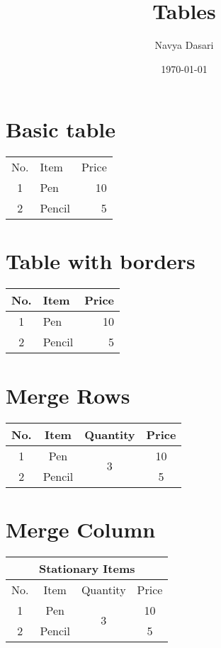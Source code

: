\documentclass[12pt]{article}
\title{Tables}
\author{Navya Dasari}
\date{\today}
\begin{document}
	\maketitle
	
	\section{Basic table}
	
		\begin{tabular}{clr}
		
		No.	&	Item	&	Price \\
		1	&	Pen		& 10 \\
		2	&	Pencil	& 5 \\
		
		\end{tabular}
		
	\section{Table with borders}
		\begin{tabular}{|c|l|r|}
			\hline
			No.	&	Item	&	Price \\
			\hline
			1	&	Pen		& 10 \\
			\hline
			2	&	Pencil	& 5 \\
			\hline
			
		\end{tabular}
		
	\section{Merge Rows}
	
	\begin{tabular}{|c|c|c|c|}
		\hline
		No. & Item & Quantity & Price \\
		\hline
		1	& Pen & \multirow{2}{*}{3} & 10 \\
		\cline{1-2}\cline{4-4}
		2 & Pencil & & 5 \\
		\hline
	\end{tabular}
	
	\section{Merge Column}
	
	\begin{tabular}{|c|c|c|c|}
		\hline
		\multicolumn{4}{|c|}{Stationary Items} \\
		\hline
		No. & Item & Quantity & Price \\
		\hline
		1	& Pen & \multirow{2}{*}{3} & 10 \\
		\cline{1-2}\cline{4-4}
		2 & Pencil & & 5 \\
		\hline
	\end{tabular}
	
\end{document}
